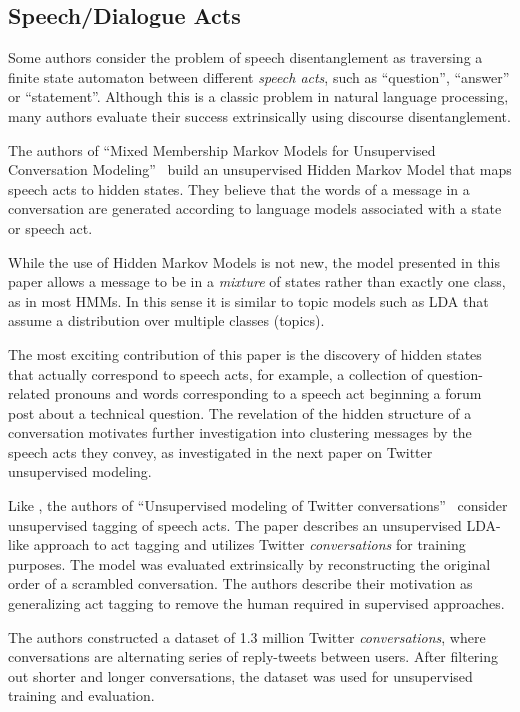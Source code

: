 \documentclass[11pt]{article}
\newcommand{\titlecite}[2]{``#1''~\cite{#2}}
\begin{document}
\subsection{Speech/Dialogue Acts}
Some authors consider the problem of speech disentanglement as traversing 
a finite state automaton between different \textit{speech acts}, such as
``question'', ``answer'' or ``statement''. Although this is a classic problem in
natural language processing, many authors evaluate their success extrinsically 
using discourse disentanglement.

The authors of \titlecite{Mixed Membership Markov Models for Unsupervised
Conversation Modeling}{Paula} build an unsupervised Hidden Markov Model that 
maps speech acts to hidden states. They believe that the words of a message 
in a conversation are generated according to language models associated
with a state or speech act. 

While the use of Hidden Markov Models is not new, the model presented in this
paper allows a message to be in a \emph{mixture} of states rather than exactly
one class, as in most HMMs. In this sense it is similar to topic models such as
LDA that assume a distribution over multiple classes (topics).

The most exciting contribution of this paper is the discovery of hidden states
that actually correspond to speech acts, for example, a collection of
question-related pronouns and words corresponding to a speech act beginning a
forum post about a technical question. The revelation of the hidden structure of
a conversation motivates further investigation into clustering messages by the
speech acts they convey, as investigated in the next paper on Twitter
unsupervised modeling.

Like \cite{Paula}, the authors of \titlecite{Unsupervised modeling of Twitter
conversations}{Ritter2010a} consider unsupervised tagging of speech acts.
The paper describes an unsupervised LDA-like approach to act tagging 
and utilizes Twitter \textit{conversations} for
training purposes. The model was evaluated extrinsically by reconstructing 
the original order of a scrambled conversation. The authors describe their motivation as
generalizing act tagging to remove the human required in supervised approaches. 

The authors constructed a dataset of 1.3 million Twitter \textit{conversations}, 
where conversations are alternating series of reply-tweets between users. After filtering out shorter 
and longer conversations, the dataset was used for unsupervised training and evaluation.
\end{document}
